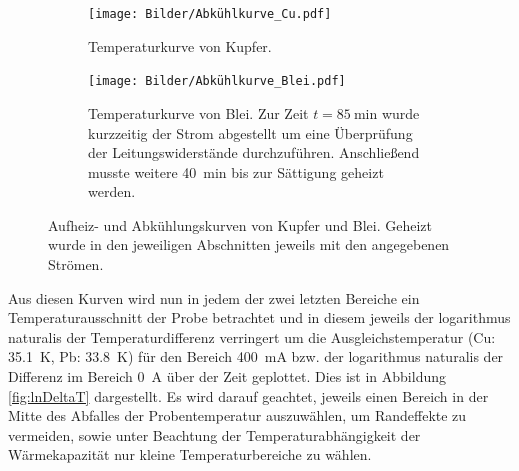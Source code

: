 \documentclass[parskip=half, a4paper,twoside,final]{article}
\begin{document}
\begin{figure}[h!]
  \centering
  \begin{subfigure}{0.95\textwidth}
    \texttt{[image: Bilder/Abkühlkurve\_Cu.pdf]}
    \caption{Temperaturkurve von Kupfer.}
  \end{subfigure}
  \begin{subfigure}{0.95\textwidth}
    \texttt{[image: Bilder/Abkühlkurve\_Blei.pdf]}
    \caption{Temperaturkurve von Blei. Zur Zeit $t=\SI{85}{\minute}$ wurde kurzzeitig der Strom abgestellt um eine Überprüfung der Leitungswiderstände durchzuführen. Anschließend musste weitere \SI{40}{\minute} bis zur Sättigung geheizt werden.}
  \end{subfigure}
  \caption{Aufheiz- und Abkühlungskurven von Kupfer und Blei. Geheizt wurde in den jeweiligen Abschnitten jeweils mit den angegebenen Strömen.}
  \label{fig:Aufheiz-und Entladekurven}
\end{figure}
\newpage
Aus diesen Kurven wird nun in jedem der zwei letzten Bereiche ein Temperaturausschnitt der Probe betrachtet und in diesem jeweils der logarithmus naturalis der Temperaturdifferenz verringert um die Ausgleichstemperatur (Cu: \SI{35,1}{\kelvin}, Pb: \SI{33,8}{\kelvin}) für den Bereich \SI{400}{\milli\ampere} bzw. der logarithmus naturalis der Differenz im Bereich \SI{0}{\ampere} über der Zeit geplottet. Dies ist in Abbildung \ref{fig:lnDeltaT} dargestellt. Es wird darauf geachtet, jeweils einen Bereich in der Mitte des Abfalles der Probentemperatur auszuwählen, um Randeffekte zu vermeiden, sowie unter Beachtung der Temperaturabhängigkeit der Wärmekapazität nur kleine Temperaturbereiche zu wählen.
\end{document}
